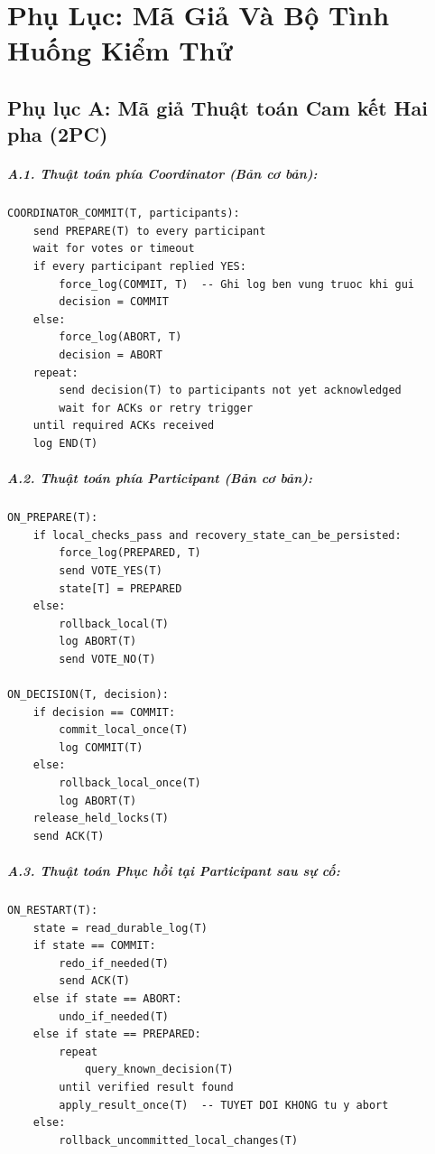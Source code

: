 \documentclass[12pt,a4paper]{report}
\begin{document}
\chapter*{Phụ Lục: Mã Giả Và Bộ Tình Huống Kiểm Thử}

\section*{Phụ lục A: Mã giả Thuật toán Cam kết Hai pha (2PC)}

\paragraph{A.1. Thuật toán phía Coordinator (Bản cơ bản):}
\begin{lstlisting}
COORDINATOR_COMMIT(T, participants):
    send PREPARE(T) to every participant
    wait for votes or timeout
    if every participant replied YES:
        force_log(COMMIT, T)  -- Ghi log ben vung truoc khi gui
        decision = COMMIT
    else:
        force_log(ABORT, T)
        decision = ABORT
    repeat:
        send decision(T) to participants not yet acknowledged
        wait for ACKs or retry trigger
    until required ACKs received
    log END(T)
\end{lstlisting}

\paragraph{A.2. Thuật toán phía Participant (Bản cơ bản):}
\begin{lstlisting}
ON_PREPARE(T):
    if local_checks_pass and recovery_state_can_be_persisted:
        force_log(PREPARED, T)
        send VOTE_YES(T)
        state[T] = PREPARED
    else:
        rollback_local(T)
        log ABORT(T)
        send VOTE_NO(T)

ON_DECISION(T, decision):
    if decision == COMMIT:
        commit_local_once(T)
        log COMMIT(T)
    else:
        rollback_local_once(T)
        log ABORT(T)
    release_held_locks(T)
    send ACK(T)
\end{lstlisting}

\paragraph{A.3. Thuật toán Phục hồi tại Participant sau sự cố:}
\begin{lstlisting}
ON_RESTART(T):
    state = read_durable_log(T)
    if state == COMMIT: 
        redo_if_needed(T)
        send ACK(T)
    else if state == ABORT: 
        undo_if_needed(T)
    else if state == PREPARED:
        repeat 
            query_known_decision(T) 
        until verified result found
        apply_result_once(T)  -- TUYET DOI KHONG tu y abort
    else:
        rollback_uncommitted_local_changes(T)
\end{lstlisting}
\end{document}
